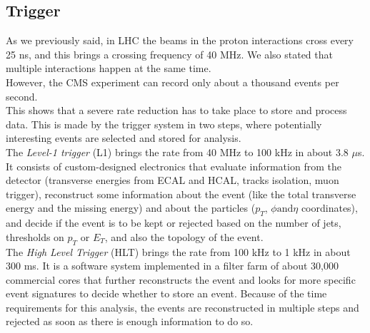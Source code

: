 \subsection{Trigger}
As we previously said, in LHC the beams in the proton interactions cross every 25 ns, and this brings a crossing frequency of 40 MHz. We also stated that multiple interactions happen at the same time.\\
However, the CMS experiment can record only about a thousand events per second.\\
This shows that a severe rate reduction has to take place to store and process data. This is made by the trigger system in two steps, where potentially interesting events are selected and stored for analysis.\\
The \emph{Level-1 trigger} (L1)  brings the rate from 40 MHz to 100 kHz in about 3.8 $\mu$s. It consists of custom-designed electronics that evaluate information from the detector (transverse energies from ECAL and HCAL, tracks isolation, muon trigger), reconstruct some information about the event (like the total transverse energy and the missing energy) and about the particles ($p_T$, $\phi \text{and} \eta$ coordinates), and decide if the event is to be kept or rejected based on the number of jets, thresholds on $p_T$ or $E_T$, and also the topology of the event.\\
The \emph{High Level Trigger} (HLT) brings the rate from 100 kHz to 1 kHz in about 300 ms. It is a software system implemented in a filter farm of about 30,000 commercial cores that further reconstructs the event and looks for more specific event signatures to decide whether to store an event. Because of the time requirements for this analysis, the events are reconstructed in multiple steps and rejected as soon as there is enough information to do so.
